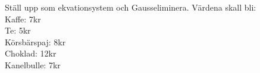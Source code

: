 Ställ upp som ekvationsystem och Gausseliminera. Värdena skall bli:\\
Kaffe: 7kr\\
Te: 5kr\\
Körsbärspaj: 8kr\\
Choklad: 12kr\\
Kanelbulle: 7kr